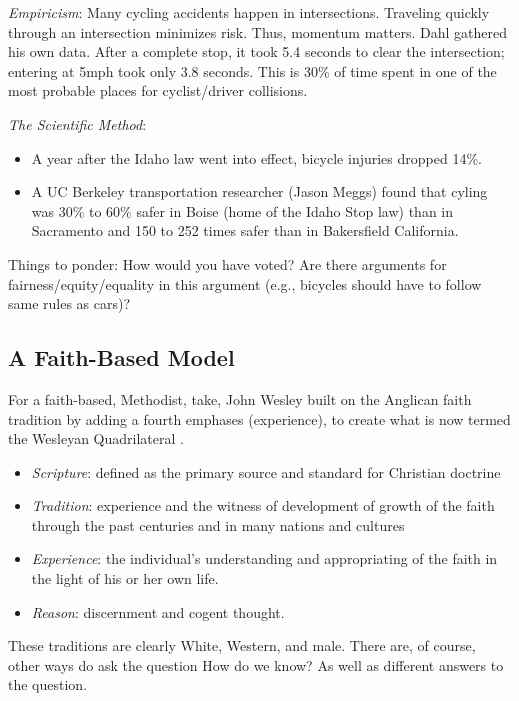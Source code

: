 \documentclass[
  english,
]{book}
\providecommand{\tightlist}{%
  \setlength{\itemsep}{0pt}\setlength{\parskip}{0pt}}
\begin{document}
\emph{Empiricism}: Many cycling accidents happen in intersections. Traveling quickly through an intersection minimizes risk. Thus, momentum matters. Dahl \citeyearpar{dahl_heres_2020}gathered his own data. After a complete stop, it took 5.4 seconds to clear the intersection; entering at 5mph took only 3.8 seconds. This is 30\% of time spent in one of the most probable places for cyclist/driver collisions.

\emph{The Scientific Method}:

\begin{itemize}
\tightlist
\item
  A year after the Idaho law went into effect, bicycle injuries dropped 14\%.
\item
  A UC Berkeley transportation researcher (Jason Meggs) found that cyling was 30\% to 60\% safer in Boise (home of the Idaho Stop law) than in Sacramento and 150 to 252 times safer than in Bakersfield California.
\end{itemize}

Things to ponder: How would you have voted? Are there arguments for fairness/equity/equality in this argument (e.g., bicycles should have to follow same rules as cars)?

\hypertarget{a-faith-based-model}{%
\subsection{A Faith-Based Model}\label{a-faith-based-model}}

For a faith-based, Methodist, take, John Wesley built on the Anglican faith tradition by adding a fourth emphases (experience), to create what is now termed the Wesleyan Quadrilateral \citep{noauthor_glossary_nodate}.

\begin{itemize}
\tightlist
\item
  \emph{Scripture}: defined as the primary source and standard for Christian doctrine
\item
  \emph{Tradition}: experience and the witness of development of growth of the faith through the past centuries and in many nations and cultures
\item
  \emph{Experience}: the individual's understanding and appropriating of the faith in the light of his or her own life.
\item
  \emph{Reason}: discernment and cogent thought.
\end{itemize}

These traditions are clearly White, Western, and male. There are, of course, other ways do ask the question How do we know? As well as different answers to the question.
\end{document}
